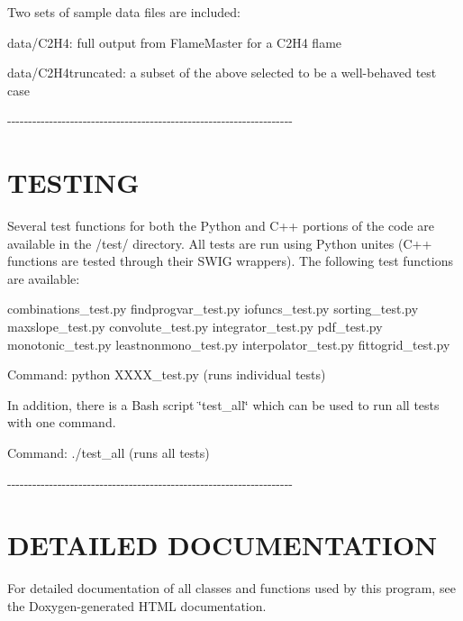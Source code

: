 Two sets of sample data files are included:
\begin{DoxyItemize}
\item data/C2H4: full output from FlameMaster for a C2H4 flame
\item data/C2H4truncated: a subset of the above selected to be a well-\/behaved test case
\end{DoxyItemize}

-\/-\/-\/-\/-\/-\/-\/-\/-\/-\/-\/-\/-\/-\/-\/-\/-\/-\/-\/-\/-\/-\/-\/-\/-\/-\/-\/-\/-\/-\/-\/-\/-\/-\/-\/-\/-\/-\/-\/-\/-\/-\/-\/-\/-\/-\/-\/-\/-\/-\/-\/-\/-\/-\/-\/-\/-\/-\/-\/-\/-\/-\/-\/-\/-\/-\/-\/-\/\hypertarget{index__5_}{}\section{TESTING}\label{index__5_}
Several test functions for both the Python and C++ portions of the code are available in the /test/ directory. All tests are run using Python unites (C++ functions are tested through their SWIG wrappers). The following test functions are available:

combinations\_\-test.py findprogvar\_\-test.py iofuncs\_\-test.py sorting\_\-test.py maxslope\_\-test.py convolute\_\-test.py integrator\_\-test.py pdf\_\-test.py monotonic\_\-test.py leastnonmono\_\-test.py interpolator\_\-test.py fittogrid\_\-test.py

Command: python XXXX\_\-test.py (runs individual tests)

In addition, there is a Bash script \char`\"{}test\_\-all\char`\"{} which can be used to run all tests with one command.

Command: ./test\_\-all (runs all tests)

-\/-\/-\/-\/-\/-\/-\/-\/-\/-\/-\/-\/-\/-\/-\/-\/-\/-\/-\/-\/-\/-\/-\/-\/-\/-\/-\/-\/-\/-\/-\/-\/-\/-\/-\/-\/-\/-\/-\/-\/-\/-\/-\/-\/-\/-\/-\/-\/-\/-\/-\/-\/-\/-\/-\/-\/-\/-\/-\/-\/-\/-\/-\/-\/-\/-\/-\/-\/\hypertarget{index__6_}{}\section{DETAILED DOCUMENTATION}\label{index__6_}
For detailed documentation of all classes and functions used by this program, see the Doxygen-\/generated HTML documentation. 